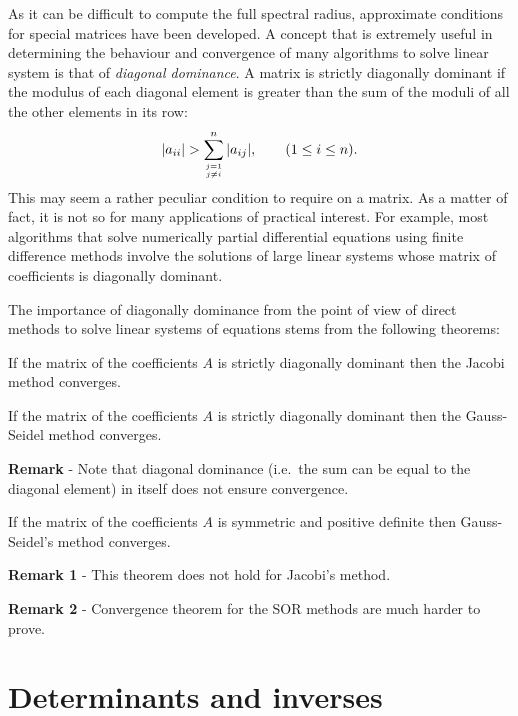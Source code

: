 As it can be difficult to compute the full spectral radius, approximate conditions for special matrices have been developed.
A concept that is extremely useful in determining the behaviour and convergence of many algorithms to solve linear system is that of \textit{diagonal dominance}.
A matrix is strictly diagonally dominant if the modulus of each diagonal element is greater than the sum of the moduli of all the other elements in its row:
%
\begin{equation*}
  | a_{i i} | > \sum_{\genfrac{}{}{0pt}{}{j=1}{j \ne i}}^n
  | a_{i j} |, \qquad (1 \le i \le n) .
\end{equation*}
%
This may seem a rather peculiar condition to require on a matrix.
As a matter of fact, it is not so for many applications of practical interest.
For example, most algorithms that solve numerically partial differential equations using finite difference methods involve the solutions of large linear systems whose matrix of coefficients is diagonally dominant.

The importance of diagonally dominance from the point of view of direct methods to solve linear systems of equations stems from the following theorems:

\begin{theorem}
If the matrix of the coefficients $A$ is strictly diagonally dominant then the Jacobi method converges.
\end{theorem}

\medskip

\begin{theorem}
If the matrix of the coefficients $A$ is strictly diagonally dominant then the Gauss-Seidel method converges.
\end{theorem}

\noindent
\textbf{Remark} - Note that diagonal dominance (i.e.\ the sum can be equal to the diagonal element) in itself does not ensure convergence.

\smallskip

\begin{theorem}
If the matrix of the coefficients $A$ is symmetric and positive definite then Gauss-Seidel's method converges.
\end{theorem}

\noindent
\textbf{Remark 1} - This theorem does not hold for Jacobi's method.

\noindent
\textbf{Remark 2} - Convergence theorem for the SOR methods are much
harder to prove.

\section{Determinants and inverses}

